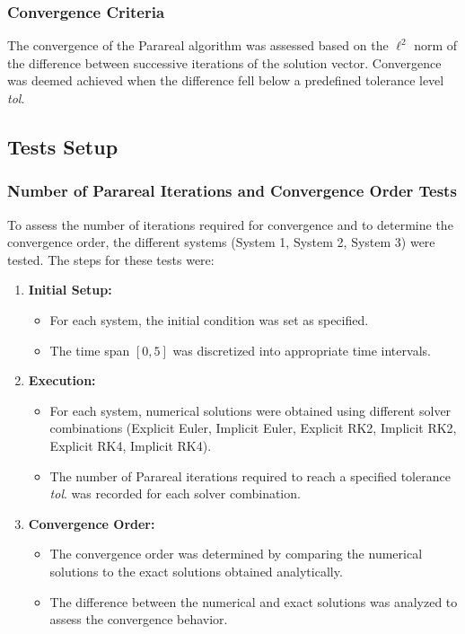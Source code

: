 \documentclass[a4paper,12pt,french]{article}
\begin{document}
\subsubsection{Convergence Criteria}
The convergence of the Parareal algorithm was assessed based on the $\boldsymbol\ell^2$ norm of the difference between successive iterations of the solution vector. Convergence was deemed achieved when the difference fell below a predefined tolerance level \textit{tol}.

\subsection{Tests Setup}
\subsubsection{Number of Parareal Iterations and Convergence Order Tests}
To assess the number of iterations required for convergence and to determine the convergence order, the different systems (System 1, System 2, System 3) were tested.
The steps for these tests were:
\begin{enumerate}
    \item \textbf{Initial Setup:}
        \begin{itemize}
            \item For each system, the initial condition was set as specified.
            \item The time span $[0,5]$ was discretized into appropriate time intervals.
        \end{itemize}
    \item \textbf{Execution:}
        \begin{itemize}
            \item For each system, numerical solutions were obtained using different solver combinations (Explicit Euler, Implicit Euler, Explicit RK2, Implicit RK2, Explicit RK4, Implicit RK4).
            \item The number of Parareal iterations required to reach a specified tolerance \textit{tol}. was recorded for each solver combination.
        \end{itemize}
    \item \textbf{Convergence Order:}
        \begin{itemize}
            \item The convergence order was determined by comparing the numerical solutions to the exact solutions obtained analytically.
            \item The difference between the numerical and exact solutions was analyzed to assess the convergence behavior.
        \end{itemize}
\end{enumerate}
\end{document}
